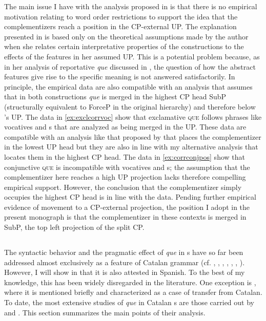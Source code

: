 The main issue I have with the analysis proposed in \citet{Corr2016} is that there  is no  empirical motivation relating to word order restrictions to support the idea that   the complementizers reach a position in the CP-external UP. The explanation presented in \citet{Corr2016} is based only  on the theoretical assumptions made by the author when she relates certain interpretative properties of the constructions 
to the  effects of the features in her assumed UP. This is a potential problem because, as in her analysis of  reportative \emph{que} discussed in , the question of  how the abstract features give rise to the specific meaning is not answered  satisfactorily.  In principle, the empirical data are also compatible with an analysis that assumes that in both  constructions \emph{que} is merged in  the highest CP head SubP (structurally equivalent to ForceP in the original hierarchy) and therefore below \citeauthor{Corr2016}'s UP. The data in \eqref{ex:exclcorrvoc} show that exclamative \textsc{que}  follows phrases like vocatives and s that are analyzed as being merged in the UP. These data are compatible with an analysis like that proposed by \citet{Corr2016} that places the complementizer in the lowest UP head but they are also in line with my alternative analysis that locates them  in the highest CP head. The data in \eqref{ex:corrconjpos} show that conjunctive \textsc{que} is incompatible with vocatives and s;  the assumption that the complementizer here reaches a high UP projection lacks therefore compelling empirical support. However, the conclusion that the complementizer simply occupies the highest CP head is  in line with the data. Pending further empirical evidence of movement to a CP-external projection, the position I adopt in the present monograph is that the complementizer in these contexts is merged in SubP, the top left projection of the split CP. 

\subsection{\citet{PrietoRigau2007}}

The syntactic behavior and the pragmatic effect of  \textit{que} in s have so far  been addressed almost exclusively as a feature of Catalan grammar (cf. \citealt{Rigau1984}, \citealt{MascaroiPons1986}, \citealt{Cuenca1997}, \citealt{Prieto1997, Prieto2002}, \citealt{Payrato2002}, \citealt{Celdran2005}, \citealt{HernanzRigau2006}). However, I will show in  that it is also attested in Spanish. To the best of  my knowledge, this has been widely disregarded in the literature. One exception is \citet{Hualde1992}, where it is mentioned briefly and characterized as a case of transfer from Catalan. To date, the most extensive studies of \emph{que} in Catalan s are those carried out by \citet{Rigau2005} and \citet{PrietoRigau2007}. This section summarizes the main points of their analysis. 

